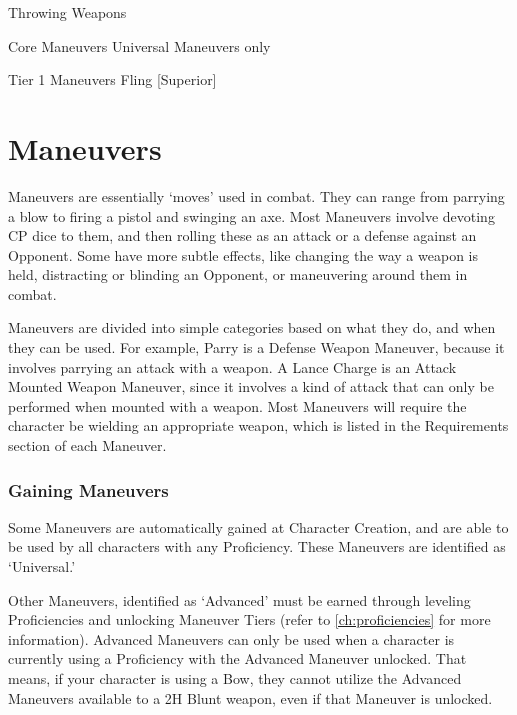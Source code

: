 \documentclass[oneside,11pt,english]{book}
\begin{document}
 

Throwing Weapons 

 

Core Maneuvers 
Universal Maneuvers only 

 

Tier 1 Maneuvers 
Fling [Superior] 

\chapter{Maneuvers}\label{ch:maneuvers} %
\startcontents[chapters]
\clearpage
Maneuvers are essentially ‘moves’ used in combat. They can range from parrying a blow to firing a pistol and swinging an axe. Most Maneuvers involve devoting CP dice to them, and then rolling these as an attack or a defense against an Opponent. Some have more subtle effects, like changing the way a weapon is held, distracting or blinding an Opponent, or maneuvering around them in combat.


Maneuvers are divided into simple categories based on what they do, and when they can be used. For example, Parry is a Defense Weapon Maneuver, because it involves parrying an attack with a weapon. A Lance Charge is an Attack Mounted Weapon Maneuver, since it involves a kind of attack that can only be performed when mounted with a weapon. Most Maneuvers will require the character be wielding an appropriate weapon, which is listed in the Requirements section of each Maneuver.


\subsection{Gaining Maneuvers}
Some Maneuvers are automatically gained at Character Creation, and are able to be used by all characters with any Proficiency. These Maneuvers are identified as ‘Universal.’


Other Maneuvers, identified as ‘Advanced’ must be earned through leveling Proficiencies and unlocking Maneuver Tiers (refer to \autoref{ch:proficiencies} for more information). Advanced Maneuvers can only be used when a character is currently using a Proficiency with the Advanced Maneuver unlocked. That means, if your character is using a Bow, they cannot utilize the Advanced Maneuvers available to a 2H Blunt weapon, even if that Maneuver is unlocked.
\end{document}

